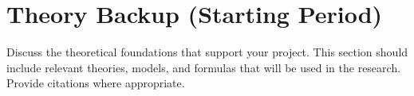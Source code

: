 \section{Theory Backup (Starting Period)}
\label{sec:theory}
Discuss the theoretical foundations that support your project. This section should include relevant theories, models, and formulas that will be used in the research. Provide citations where appropriate.
